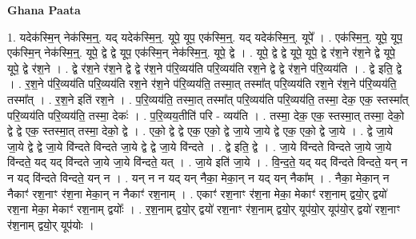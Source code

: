 \documentclass[17pt]{extarticle}
\begin{document}
\textbf{Ghana Paata } \newline

1. यदेक॑स्मि॒न् नेक॑स्मि॒न्॒. यद् यदेक॑स्मि॒न्॒. यूपे॒ यूप॒ एक॑स्मि॒न्॒. यद् यदेक॑स्मि॒न्॒. यूपे᳚ । . एक॑स्मि॒न्॒. यूपे॒ यूप॒ एक॑स्मि॒न् नेक॑स्मि॒न्॒. यूपे॒ द्वे द्वे यूप॒ एक॑स्मि॒न् नेक॑स्मि॒न्॒. यूपे॒ द्वे । . यूपे॒ द्वे द्वे यूपे॒ यूपे॒ द्वे र॑श॒ने र॑श॒ने द्वे यूपे॒ यूपे॒ द्वे र॑श॒ने । . द्वे र॑श॒ने र॑श॒ने द्वे द्वे र॑श॒ने प॑रि॒व्यय॑ति परि॒व्यय॑ति रश॒ने द्वे द्वे र॑श॒ने प॑रि॒व्यय॑ति । . द्वे इति॒ द्वे । . र॒श॒ने प॑रि॒व्यय॑ति परि॒व्यय॑ति रश॒ने र॑श॒ने प॑रि॒व्यय॑ति॒ तस्मा॒त् तस्मा᳚त् परि॒व्यय॑ति रश॒ने र॑श॒ने प॑रि॒व्यय॑ति॒ तस्मा᳚त् । . र॒श॒ने इति॑ रश॒ने । . प॒रि॒व्यय॑ति॒ तस्मा॒त् तस्मा᳚त् परि॒व्यय॑ति परि॒व्यय॑ति॒ तस्मा॒ देक॒ एक॒ स्तस्मा᳚त् परि॒व्यय॑ति परि॒व्यय॑ति॒ तस्मा॒ देकः॑ । . प॒रि॒व्यय॒तीति॑ परि - व्यय॑ति । . तस्मा॒ देक॒ एक॒ स्तस्मा॒त् तस्मा॒ देको॒ द्वे द्वे एक॒ स्तस्मा॒त् तस्मा॒ देको॒ द्वे । . एको॒ द्वे द्वे एक॒ एको॒ द्वे जा॒ये जा॒ये द्वे एक॒ एको॒ द्वे जा॒ये । . द्वे जा॒ये जा॒ये द्वे द्वे जा॒ये वि॑न्दते विन्दते जा॒ये द्वे द्वे जा॒ये वि॑न्दते । . द्वे इति॒ द्वे । . जा॒ये वि॑न्दते विन्दते जा॒ये जा॒ये वि॑न्दते॒ यद् यद् वि॑न्दते जा॒ये जा॒ये वि॑न्दते॒ यत् । . जा॒ये इति॑ जा॒ये । . वि॒न्द॒ते॒ यद् यद् वि॑न्दते विन्दते॒ यन् न न यद् वि॑न्दते विन्दते॒ यन् न । . यन् न न यद् यन् नैका॒ मेका॒न् न यद् यन् नैका᳚म् । . नैका॒ मेका॒न् न नैकाꣳ॑ रश॒नाꣳ र॑श॒ना मेका॒न् न नैकाꣳ॑ रश॒नाम् । . एकाꣳ॑ रश॒नाꣳ र॑श॒ना मेका॒ मेकाꣳ॑ रश॒नाम् द्वयो॒र् द्वयो॑ रश॒ना मेका॒ मेकाꣳ॑ रश॒नाम् द्वयोः᳚ । . र॒श॒नाम् द्वयो॒र् द्वयो॑ रश॒नाꣳ र॑श॒नाम् द्वयो॒र् यूप॑यो॒र् यूप॑यो॒र् द्वयो॑ रश॒नाꣳ र॑श॒नाम् द्वयो॒र् यूप॑योः । \newline
\end{document}
